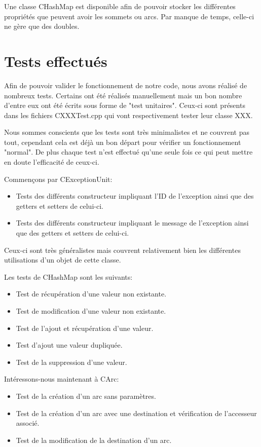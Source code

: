 		Une classe CHashMap est disponible afin de pouvoir stocker les différentes propriétés que peuvent avoir les sommets ou arcs. Par manque de temps, celle-ci ne gère que des doubles.
	\chapter{Tests effectués}
		Afin de pouvoir valider le fonctionnement de notre code, nous avons réalisé de nombreux tests. Certains ont été réalisés manuellement mais un bon nombre d'entre eux ont été écrits sous forme de "test unitaires". Ceux-ci sont présents dans les fichiers CXXXTest.cpp qui vont respectivement tester leur classe XXX.
		
		Nous sommes conscients que les tests sont très minimalistes et ne couvrent pas tout, cependant cela est déjà un bon départ pour vérifier un fonctionnement "normal". De plus chaque test n'est effectué qu'une seule fois ce qui peut mettre en doute l'efficacité de ceux-ci.
		
		Commençons par CExceptionUnit:
		\begin{itemize}
			\item Tests des différents constructeur impliquant l'ID de l'exception ainsi que des getters et setters de celui-ci.
			\item Tests des différents constructeur impliquant le message de l'exception ainsi que des getters et setters de celui-ci.\\
		\end{itemize}
		Ceux-ci sont très généralistes mais couvrent relativement bien les différentes utilisations d'un objet de cette classe.
		
		Les tests de CHashMap sont les suivants:
		\begin{itemize}
			\item Test de récupération d'une valeur non existante.
			\item Test de modification d'une valeur non existante.
			\item Test de l'ajout et récupération d'une valeur.
			\item Test d'ajout une valeur dupliquée.
			\item Test de la suppression d'une valeur.
		\end{itemize}
		
		Intéressons-nous maintenant à CArc:
		\begin{itemize}
			\item Test de la création d'un arc sans paramètres.
			\item Test de la création d'un arc avec une destination et vérification de l'accesseur associé.
			\item Test de la modification de la destination d'un arc.
		\end{itemize}
		
